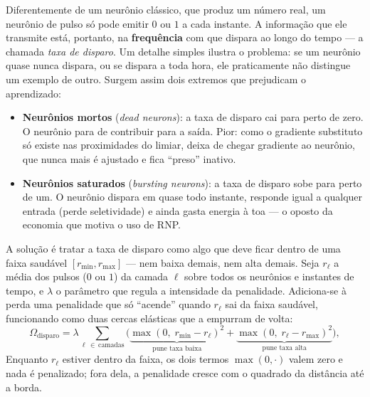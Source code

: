 \begin{apendicesenv}
		\par Diferentemente de um neurônio clássico, que produz um número real, um neurônio de pulso só pode emitir $0$ ou $1$ a cada instante. A informação que ele transmite está, portanto, na \textbf{frequência} com que dispara ao longo do tempo --- a chamada \textit{taxa de disparo}. Um detalhe simples ilustra o problema: se um neurônio quase nunca dispara, ou se dispara a toda hora, ele praticamente não distingue um exemplo de outro. Surgem assim dois extremos que prejudicam o aprendizado:
		\begin{itemize}
			\item \textbf{Neurônios mortos} (\textit{dead neurons}): a taxa de disparo cai para perto de zero. O neurônio para de contribuir para a saída. Pior: como o gradiente substituto só existe nas proximidades do limiar, deixa de chegar gradiente ao neurônio, que nunca mais é ajustado e fica ``preso'' inativo.
			\item \textbf{Neurônios saturados} (\textit{bursting neurons}): a taxa de disparo sobe para perto de um. O neurônio dispara em quase todo instante, responde igual a qualquer entrada (perde seletividade) e ainda gasta energia à toa --- o oposto da economia que motiva o uso de RNP.
		\end{itemize}

		\par A solução é tratar a taxa de disparo como algo que deve ficar dentro de uma faixa saudável $[r_{\min}, r_{\max}]$ --- nem baixa demais, nem alta demais. Seja $r_\ell$ a média dos pulsos ($0$ ou $1$) da camada $\ell$ sobre todos os neurônios e instantes de tempo, e $\lambda$ o parâmetro que regula a intensidade da penalidade. Adiciona-se à perda uma penalidade que só ``acende'' quando $r_\ell$ sai da faixa saudável, funcionando como duas cercas elásticas que a empurram de volta:
		\begin{equation}
			\label{eq:firingRateReg}
			\Omega_{\text{disparo}} = \lambda \sum_{\ell\,\in\,\text{camadas}} \Big( \underbrace{\max(0,\; r_{\min} - r_\ell)^2}_{\text{pune taxa baixa}} + \underbrace{\max(0,\; r_\ell - r_{\max})^2}_{\text{pune taxa alta}} \Big),
		\end{equation}
		Enquanto $r_\ell$ estiver dentro da faixa, os dois termos $\max(0, \cdot)$ valem zero e nada é penalizado; fora dela, a penalidade cresce com o quadrado da distância até a borda.


\end{apendicesenv}
